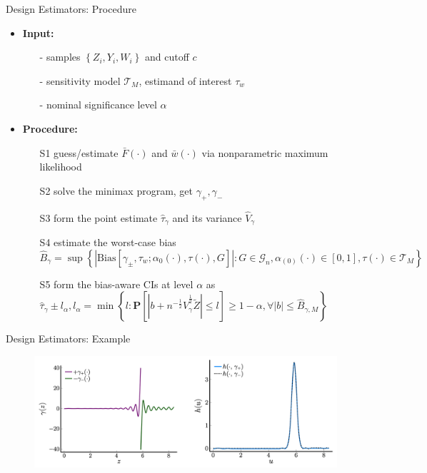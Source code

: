 \begin{frame}{Design Estimators: Procedure}

    \begin{itemize}
        \item<1-> \textcolor{mygreen}{\textbf{Input:}}
        \begin{itemize}
            \item[-] samples $ \left\{ Z_{i},Y_{i},W_{i}\right\} $ and cutoff $c$
            \item[-] sensitivity model $\mathcal{T}_{M}$, estimand of interest $\tau_{w}$
            \item[-] nominal significance level $\alpha$ 
        \end{itemize}

        \item<2-> \textcolor{mygreen}{\textbf{Procedure:}}
        \begin{itemize}
            \item[S1] guess/estimate $\bar{F}\left(\cdot\right)$ and $\bar{w}\left(\cdot\right)$ via nonparametric maximum likelihood
            \item[S2] solve the minimax program, get $\gamma_{+},\gamma_{-}$ 
            \item[S3] form the point estimate $\hat{\tau}_{\gamma}$ and its variance $\hat{V}_{\gamma}$
            \item[S4] estimate the worst-case bias $\hat{B}_{\gamma}=\sup\left\{ \left|\mathrm{Bias}\left[\gamma_{\pm},\tau_{w};\alpha_{0}\left(\cdot\right),\tau\left(\cdot\right),G\right]\right|:G\in\mathcal{G}_{n},\alpha_{\left(0\right)}\left(\cdot\right)\in\left[0,1\right],\tau\left(\cdot\right)\in\mathcal{T}_{M}\right\} $
            \item[S5] form the bias-aware CIs at level $\alpha$ as $\hat{\tau}_{\gamma}\pm l_{\alpha},l_{\alpha}=\min\left\{ l:\mathbf{P}\left[\left|b+n^{-\frac{1}{2}}\hat{V}_{\gamma}^{\frac{1}{2}}\tilde{Z}\right|\leq l\right]\geq1-\alpha,\forall\left|b\right|\leq\hat{B}_{\gamma,M}\right\} $
        \end{itemize}
    \end{itemize}
    
\end{frame}

\begin{frame}{Design Estimators: Example}
    \begin{figure}\label{fig:example}
        \centering
        \includegraphics[height = 0.65 \textheight]{images/fig1.png}
        \end{figure}
\end{frame}